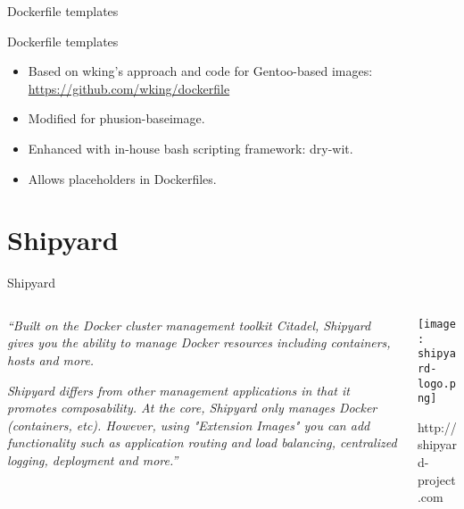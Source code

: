 \documentclass[presentation]{beamer}
\begin{document}
{
\begin{frame}[label=sec-4-6]{Dockerfile templates}

\begin{block}{Dockerfile templates}

\begin{itemize}
\item Based on wking's approach and code for Gentoo-based images:
\url{https://github.com/wking/dockerfile}
\item Modified for phusion-baseimage.
\item Enhanced with in-house bash scripting framework: dry-wit.
\item Allows placeholders in Dockerfiles.
\end{itemize}
\end{block}
\end{frame}} %

\section{Shipyard}
\label{sec-5}

{
\begin{frame}[label=sec-5-1]{Shipyard}

\begin{columns}
\begin{column}{0.6\textwidth}

\textit{``Built on the Docker cluster management toolkit Citadel, Shipyard gives you the ability to manage Docker resources including containers, hosts and more.}

\textit{Shipyard differs from other management applications in that it promotes composability. At the core, Shipyard only manages Docker (containers, etc). However, using "Extension Images" you can add functionality such as application routing and load balancing, centralized logging, deployment and more.''}
\end{column}

\begin{column}{0.4\textwidth}
\texttt{[image: shipyard-logo.png]}

\small{http://shipyard-project.com}
\end{column}
\end{columns}
\end{frame}} %
\end{document}
